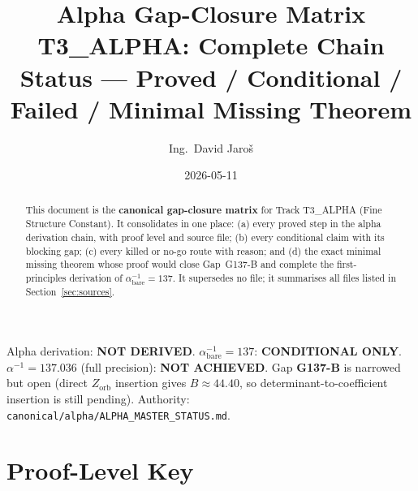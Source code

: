 \documentclass[12pt,a4paper]{article}
\title{\textbf{Alpha Gap-Closure Matrix}\\
{\large T3\_ALPHA: Complete Chain Status --- Proved / Conditional / Failed /
Minimal Missing Theorem}}
\author{Ing.\ David Jaro\v{s}}
\date{2026-05-11}
\theoremstyle{definition}
\theoremstyle{remark}
\begin{document}
\maketitle

\begin{tcolorbox}[colback=gray!5!white, colframe=gray!60!black,
  title={Canonical Status Sync (2026-05-14)}]
Alpha derivation: \textbf{NOT DERIVED}.
$\alpha^{-1}_{\mathrm{bare}} = 137$: \textbf{CONDITIONAL ONLY}.
$\alpha^{-1} = 137.036$ (full precision): \textbf{NOT ACHIEVED}.
Gap \textbf{G137-B} is narrowed but open (direct $Z_{\mathrm{orb}}$ insertion gives
$B\approx 44.40$, so determinant-to-coefficient insertion is still pending).
Authority: \texttt{canonical/alpha/ALPHA\_MASTER\_STATUS.md}.
\end{tcolorbox}

\begin{abstract}
This document is the \textbf{canonical gap-closure matrix} for Track T3\_ALPHA
(Fine Structure Constant).  It consolidates in one place: (a) every proved step in
the alpha derivation chain, with proof level and source file; (b) every
conditional claim with its blocking gap; (c) every killed or no-go route with
reason; and (d) the exact minimal missing theorem whose proof would close
Gap~G137-B and complete the first-principles derivation of
$\alpha^{-1}_{\mathrm{bare}} = 137$.
It supersedes no file; it summarises all files listed in
Section~\ref{sec:sources}.
\end{abstract}

\tableofcontents
\newpage

\section{Proof-Level Key}
\label{sec:levels}
\end{document}
